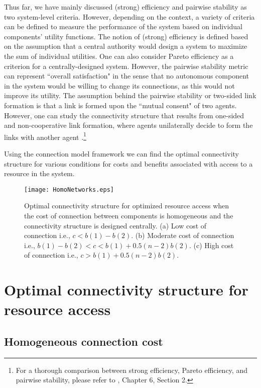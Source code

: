 \documentclass[journal,onecolumn]{IEEEtran}
\theoremstyle{plain}
\begin{document}
Thus far, we have mainly discussed (strong) efficiency and pairwise stability as two system-level criteria. However, depending on the context, a variety of criteria can be defined to measure the performance of the system based on individual components' utility functions. The notion of (strong) efficiency is defined based on the assumption that a central authority would design a system to maximize the sum of individual utilities. One can also consider Pareto efficiency as a criterion for a centrally-designed system. However, the pairwise stability metric can represent ``overall satisfaction" in the sense that no autonomous component in the system would be willing to change its connections, as this would not improve its utility. The assumption behind the pairwise stability or two-sided link formation is that a link is formed upon the ``mutual consent" of two agents. However, one can study the connectivity structure that results from one-sided and non-cooperative link formation, where agents unilaterally decide to form the links with another agent \citep{bala2000noncooperative}.\footnote{For a thorough comparison between strong efficiency, Pareto efficiency, and pairwise stability, please refer to \cite{jackson2008social}, Chapter 6, Section 2.}


Using the connection model framework we can find the optimal connectivity structure for various conditions for costs and benefits associated with access to a resource in the system.

\begin{figure}[!t]
\centering
\texttt{[image: HomoNetworks.eps]}
\caption{Optimal connectivity structure for optimized resource access when the cost of connection between components is homogeneous and the connectivity structure is designed centrally. (a) Low cost of connection i.e., $c < b(1) -b(2)$. (b) Moderate cost of connection i.e., $b(1) - b(2) < c < b(1) + 0.5(n - 2)b(2)$. (c) High cost of connection i.e., $c > b(1) + 0.5(n - 2)b(2)$.}
\label{HomoNetwork}
\end{figure}

\section{Optimal connectivity structure for resource access}
\label{OptimalConnectivity}
\subsection{Homogeneous connection cost}
\end{document}
